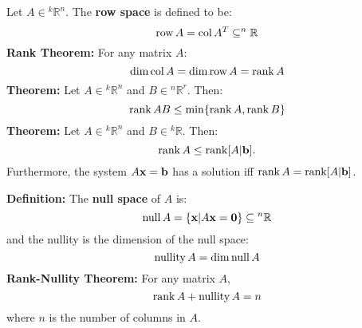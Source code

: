 \documentclass{article}
\begin{document}
\begin{minipage}[t]{.45\textwidth}
        Let $A \in {^k}\mathbb{R}^n$. The \textbf{row space} is defined to be:
        \begin{equation*}
            \mathrm{row}\,A = \mathrm{col}\,A^T \subseteq ^n\mathbb{R}
        \end{equation*}
        \textbf{Rank Theorem:} For any matrix $A$:
        \begin{equation*}
            \dim \mathrm{col}\,A = \dim \mathrm{row}\,A = \rank A
        \end{equation*}
        \textbf{Theorem:} Let $A \in {^k}\mathbb{R}^n$ and $B \in {^n}\mathbb{R}^r$. Then:
        \begin{equation*}
            \rank AB \le \min\{\rank A, \rank B\}
        \end{equation*}
        \textbf{Theorem:} Let $A \in {^k}\mathbb{R}^n$ and $B \in {^k}\mathbb{R}$. Then:
        \begin{equation*}
            \rank A \le \rank [A | \mathbf{b}].
        \end{equation*}
        Furthermore, the system $A\mathbf{x}=\mathbf{b}$ has a solution iff $\rank A = \rank [A | \mathbf{b}]$.
        \vspace{2mm}

        \textbf{Definition:} The \textbf{null space} of $A$ is:
        \begin{equation*}
            \mathrm{null}\,A = \{\mathbf{x} | A\mathbf{x} = \mathbf{0}\} \subseteq {^n}\mathbb{R}
        \end{equation*}
        and the nullity is the dimension of the null space:
        \begin{equation*}
            \mathrm{nullity}\,A = \dim \mathrm{null}\,A
        \end{equation*}
        \textbf{Rank-Nullity Theorem:} For any matrix $A$,
        \begin{equation*}
            \rank A + \mathrm{nullity}\,A = n
        \end{equation*}
        where $n$ is the number of columns in $A$.
    \end{minipage}
\end{document}
